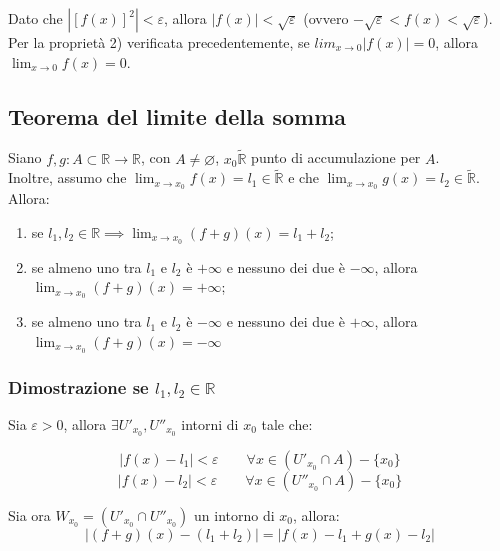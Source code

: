 \documentclass{article}
\begin{document}
\noindent Dato che $|[f(x)]^2| < \varepsilon$, allora $|f(x)| < \sqrt{\varepsilon}$ (ovvero $- \sqrt{\varepsilon} < f(x) < \sqrt{\varepsilon}$). Per la proprietà 2) verificata precedentemente, se $lim_{x \to 0} |f(x)| = 0$, allora $\lim_{x \to 0} f(x) = 0$.

\subsection{Teorema del limite della somma}
Siano $f, g: A \subset \mathbb{R} \xrightarrow{} \mathbb{R}$, con $A \neq \varnothing$, $x_0 \widetilde{\mathbb{R}}$ punto di accumulazione per $A$. \\
Inoltre, assumo che $\lim_{x \to x_0} f(x) = l_1 \in \widetilde{\mathbb{R}}$ e che $\lim_{x \to x_0} g(x) = l_2 \in \widetilde{\mathbb{R}}$. Allora:

\begin{enumerate}[label=\alph{enumi})]
    \item se $l_1, l_2 \in \mathbb{R} \implies \lim_{x \to x_0} (f + g)(x) = l_1 + l_2$;
    \item se almeno uno tra $l_1$ e $l_2$ è $+ \infty$ e nessuno dei due è $- \infty$, allora $\lim_{x \to x_0} (f + g)(x) = + \infty$;
    \item se almeno uno tra $l_1$ e $l_2$ è $- \infty$ e nessuno dei due è $+ \infty$, allora $\lim_{x \to x_0} (f + g)(x) = - \infty$
\end{enumerate}

\subsubsection{Dimostrazione se $l_1, l_2 \in \mathbb{R}$}
Sia $\varepsilon > 0$, allora $\exists U'_{x_0}, U''_{x_0}$ intorni di $x_0$ tale che:

\begin{equation*}
    |f(x) - l_1| < \varepsilon \qquad \forall x \in (U'_{x_0} \cap A) - \{x_0\}
\end{equation*}
\begin{equation*}
    |f(x) - l_2| < \varepsilon \qquad \forall x \in (U''_{x_0} \cap A) - \{x_0\}
\end{equation*}

\noindent Sia ora $W_{x_0} = (U'_{x_0} \cap U''_{x_0})$ un intorno di $x_0$, allora: 
\begin{equation*}
    |(f + g)(x) - (l_1 + l_2)| = |f(x) - l_1 + g(x) - l_2|
\end{equation*}
\end{document}
